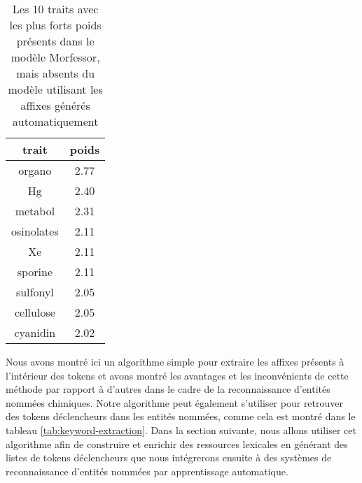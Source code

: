 \documentclass[PhD-Yoann-Dupont.tex]{subfiles}
\begin{document}
\begin{table}
\centering
\begin{tabular}{|c|c|}
\hline
trait & poids \\
\hline
organo & 2.77 \\
Hg & 2.40 \\
metabol & 2.31 \\
osinolates & 2.11 \\
Xe & 2.11 \\
sporine & 2.11 \\
sulfonyl & 2.05 \\
cellulose & 2.05 \\
cyanidin & 2.02 \\
\hline
\end{tabular}
\caption{Les 10 traits avec les plus forts poids présents dans le modèle Morfessor, mais absents du modèle utilisant les affixes générés automatiquement}
\label{tab:only-morfessor}
\end{table}

Nous avons montré ici un algorithme simple pour extraire les affixes présents à l'intérieur des tokens et avons montré les avantages et les inconvénients de cette méthode par rapport à d'autres dans le cadre de la reconnaissance d'entités nommées chimiques. Notre algorithme peut également s'utiliser pour retrouver des tokens déclencheurs dans les entités nommées, comme cela est montré dans le tableau \ref{tab:keyword-extraction}. Dans la section suivante, nous allons utiliser cet algorithme afin de construire et enrichir des ressources lexicales en générant des listes de tokens déclencheurs que nous intégrerons ensuite à des systèmes de reconnaissance d'entités nommées par apprentissage automatique.
\end{document}
